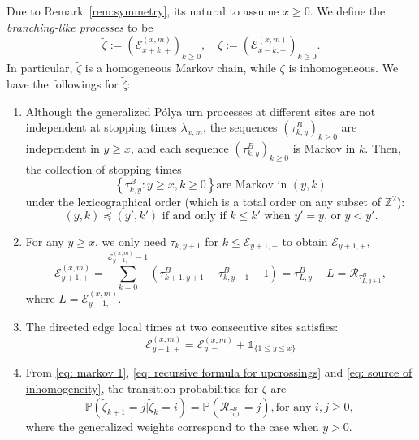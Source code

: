 \documentclass[twoside,12pt,a4paper]{article}
\numberwithin{equation}{section}
\begin{document}
		Due to Remark~\ref{rem:symmetry}, its natural to assume $x \ge 0$. We define the \textit{branching-like processes} to be
		\[
			\tilde{\zeta} := \left(\mathcal{E}^{(x,m)}_{x+k,+} \right)_{k\geq 0}, \quad
			\zeta := \left(\mathcal{E}^{(x,m)}_{x-k,-} \right)_{k\geq 0}
			.\]
		In particular, $\tilde{\zeta}$ is a homogeneous Markov chain, while $\zeta$ is inhomogeneous. We have the followings for 	$\tilde{\zeta}$:
		\begin{enumerate}
			\item Although the generalized P\'{o}lya urn processes at different sites are not independent at stopping times $\lambda_{x,m}$, the sequences $(\tau^B_{k,y})_{k\geq 0} $ are independent in $y \geq x$, and each sequence $\left(\tau^B_{k,y}\right)_{k\geq 0} $ is Markov in $k$. Then, the collection of stopping times  
			\begin{equation}\label{eq: markov 1} 
				\left\{\tau^B_{k,y}: y\geq x, k\geq 0 \right\} \mbox{are Markov in $(y,k)$}
			\end{equation}
			under the lexicographical order (which is a total order on any subset of $\mathbb{Z}^2$): 
			\begin{equation*}\label{eq: lexicographical order}
				(y,k) \preceq (y',k')  \mbox{ if and only if  }
				k \leq k'   \mbox{ when $y' = y$,  or }   
				y <y'. 
			\end{equation*} 
			
			\item For any $y\geq x$, we only need $\tau_{k,y+1}$ for $k\leq \mathcal{E}_{y+1,-}$ to obtain $\mathcal{E}_{y+1,+}$,
			\begin{equation} \label{eq: recursive formula for upcrossings}
				\mathcal{E}_{y+1,+}^{(x,m)}	=  \sum_{k= 0 }^{\mathcal{E}_{y+1,-}^{(x,m)}-1}	\left(\tau^B_{k+1,y+1}-\tau^B_{k,y+1}-1 \right) = \tau^B_{ L,y } - L = \mathcal{R}_{\tau^B_{ L,y+1 }},
			\end{equation}
			where $L = \mathcal{E}_{y+1,-}^{(x,m)}$.
			
			\item The directed edge local times at two consecutive sites satisfies:
			\begin{equation}\label{eq: source of inhomogeneity}
				\mathcal{E}_{y-1,+}^{(x,m)} = \mathcal{E}_{y,-}^{(x,m)} + \mathbb{1}_{ \{ 1\leq y \leq x \} }
			\end{equation}
			
			\item  From \eqref{eq: markov 1}, \eqref{eq: recursive formula for upcrossings} and \eqref{eq: source of inhomogeneity}, the transition probabilities for $\tilde{\zeta}$ are 
			\begin{equation}\label{eq: transition prob on positive}
				\mathbb{P}\left(\tilde{\zeta}_{k+1}=j \vert \tilde{\zeta}_k =i  \right) = 
				\mathbb{P}\left( \mathcal{R}_{\tau_{i,1}^B} = j \right), \mbox{for any $i,j\geq 0$, } 
			\end{equation} 
			where the generalized weights correspond to the case when $y>0$.
		\end{enumerate}
		  
\end{document}

